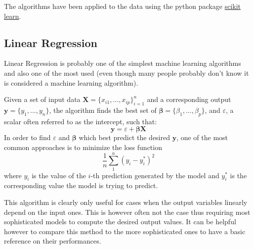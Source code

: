 The algorithms have been applied to the data using the python package \href{https://scikit-learn.org/}{scikit learn}.
\subsection{Linear Regression}\label{linearregr}
Linear Regression is probably one of the simplest machine learning algorithms and also one of the most used (even though many people probably don't know it is considered a machine learning algorithm).

Given a set of input data $\bm{X} = \{x_{i1},\ldots ,x_{ip}\}_{i=1}^{n}$ and a corresponding output $\mathbf{y} = \{y_{1},\ldots ,y_{n}\}$, the algorithm finds the best set of $\bm{\beta} = \{\beta_{1},\ldots ,\beta_{p}\}$, and $\varepsilon$, a scalar often referred to as the intercept, such that:
\begin{equation}\label{eq:linear}
\mathbf {y} = \varepsilon + \bm{\beta}\bm{X}
\end{equation}
In order to find $\varepsilon$ and $\bm{\beta}$ which best predict the desired $\mathbf {y}$, one of the most common approaches is to minimize the loss function
\begin{equation}
\frac{1}{n}\sum_{1}^{n}(y_i-y^*_i)^2
\end{equation}
where $y_i$ is the value of the $i$-th prediction generated by the model and $y^*_i$ is the corresponding value the model is trying to predict.

This algorithm is clearly only useful for cases when the output variables linearly depend on the input ones. This is however often not the case thus requiring most sophisticated models to compute the desired output values. It can be helpful however to compare this method to the more sophisticated ones to have a basic reference on their performances.

